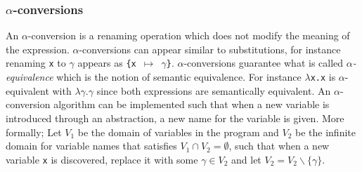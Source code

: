 \subsubsection{$\alpha$-conversions} \label{sec:alpha}
An $\alpha$-conversion is a renaming operation which does not modify the meaning of the expression.
$\alpha$-conversions can appear similar to substitutions, for instance renaming \texttt{x} to $\gamma$ appears as \texttt{\{x $\mapsto$ $\gamma$\}}.
$\alpha$-conversions guarantee what is called \textit{$\alpha$-equivalence} which is the notion of semantic equivalence.
For instance \texttt{$\lambda$x.x} is $\alpha$-equivalent with \texttt{$\lambda\gamma.\gamma$} since both expressions are semantically equivalent.
\noindent An $\alpha$-conversion algorithm can be implemented such that when a new variable is introduced through an abstraction, a new name for the variable is given.
More formally; Let $V_1$ be the domain of variables in the program and $V_2$ be the infinite domain for variable names that satisfies $V_1 \cap V_2 = \emptyset$, such that when a new variable \texttt{x} is discovered, replace it with some $\gamma \in V_2$ and let $V_2 = V_2 \backslash \{\gamma\}$.
